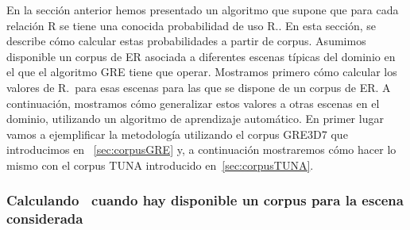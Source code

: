 En la secci\'on anterior hemos presentado un algoritmo que supone que para
cada relaci\'on R se tiene una conocida
probabilidad de uso R.\puse. En esta secci\'on, se describe c\'omo
calcular estas probabilidades a partir de corpus. Asumimos disponible un corpus de ER asociada a diferentes
escenas t\'{i}picas del dominio en el que el algoritmo GRE tiene que operar. Mostramos primero c\'omo calcular los valores de R.\puse\ para
esas escenas para las que se dispone de un corpus de ER. A continuaci\'on, mostramos c\'omo
generalizar estos valores a otras escenas en el dominio, utilizando un
algoritmo de aprendizaje autom\'atico. En primer lugar vamos a ejemplificar la
metodolog\'{i}a utilizando el corpus GRE3D7 que introducimos en ~\ref{sec:corpusGRE} y, a continuaci\'on mostraremos c\'omo hacer lo mismo con el corpus TUNA introducido en~\ref{sec:corpusTUNA}.


\subsubsection{Calculando \puse\ cuando hay disponible un corpus para la escena considerada}





